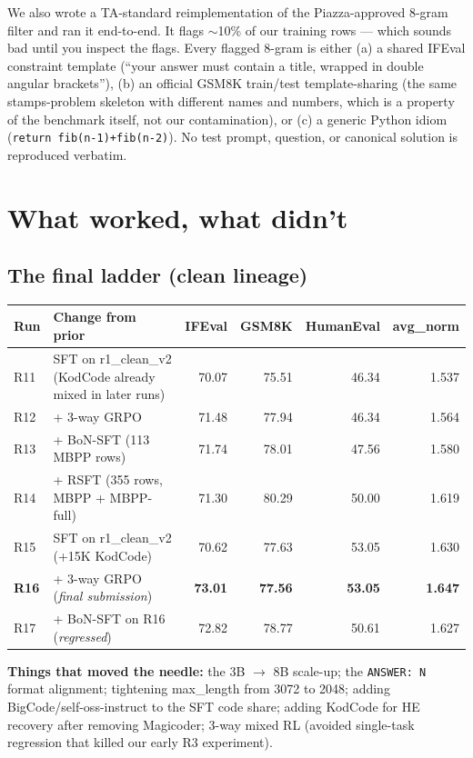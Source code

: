 \documentclass[11pt]{article}
\begin{document}
We also wrote a TA-standard reimplementation of the Piazza-approved 8-gram filter and ran it end-to-end. It flags $\sim$10\% of our training rows --- which sounds bad until you inspect the flags. Every flagged 8-gram is either (a) a shared IFEval constraint template (``your answer must contain a title, wrapped in double angular brackets''), (b) an official GSM8K train/test template-sharing (the same stamps-problem skeleton with different names and numbers, which is a property of the benchmark itself, not our contamination), or (c) a generic Python idiom (\texttt{return fib(n-1)+fib(n-2)}). No test prompt, question, or canonical solution is reproduced verbatim.

\section{What worked, what didn't}

\subsection*{The final ladder (clean lineage)}
\vspace{-0.5em}
{\footnotesize
\begin{tabular}{llrrrr}
\toprule
Run & Change from prior & IFEval & GSM8K & HumanEval & avg\_norm \\
\midrule
R11 & SFT on r1\_clean\_v2 (KodCode already mixed in later runs) & 70.07 & 75.51 & 46.34 & 1.537 \\
R12 & + 3-way GRPO & 71.48 & 77.94 & 46.34 & 1.564 \\
R13 & + BoN-SFT (113 MBPP rows) & 71.74 & 78.01 & 47.56 & 1.580 \\
R14 & + RSFT (355 rows, MBPP + MBPP-full) & 71.30 & 80.29 & 50.00 & 1.619 \\
R15 & SFT on r1\_clean\_v2 (+15K KodCode) & 70.62 & 77.63 & 53.05 & 1.630 \\
\textbf{R16} & + 3-way GRPO (\emph{final submission}) & \textbf{73.01} & \textbf{77.56} & \textbf{53.05} & \textbf{1.647} \\
R17 & + BoN-SFT on R16 (\emph{regressed}) & 72.82 & 78.77 & 50.61 & 1.627 \\
\bottomrule
\end{tabular}}

\vspace{0.5em}
\textbf{Things that moved the needle:} the 3B $\rightarrow$ 8B scale-up; the \texttt{ANSWER: N} format alignment; tightening max\_length from 3072 to 2048; adding BigCode/self-oss-instruct to the SFT code share; adding KodCode for HE recovery after removing Magicoder; 3-way mixed RL (avoided single-task regression that killed our early R3 experiment).
\end{document}
